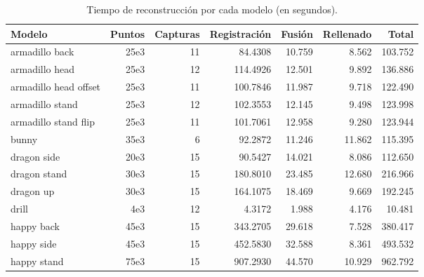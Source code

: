 \begin{table}
	\centering
	\begin{tabular}{l*{6}{r}}
		\toprule
		Modelo                 & Puntos   & Capturas  &  Registración & Fusión   & Rellenado & Total\\
		\midrule
		armadillo back         &  25e3    &   11      &   84.4308        & 10.759  &  8.562  & 103.752\\
		armadillo head         &  25e3    &   12      &   114.4926       & 12.501  &  9.892  & 136.886\\
		armadillo head offset  &  25e3    &   11      &   100.7846       & 11.987  &  9.718  & 122.490\\
		armadillo stand        &  25e3    &   12      &   102.3553       & 12.145  &  9.498  & 123.998\\
		armadillo stand flip   &  25e3    &   11      &   101.7061       & 12.958  &  9.280  & 123.944\\
		\midrule
		bunny                  &  35e3    &   6       &    92.2872       & 11.246  &  11.862 & 115.395\\
		\midrule
		dragon side            &  20e3    &   15      &   90.5427        & 14.021  &  8.086  & 112.650\\
		dragon stand           &  30e3    &   15      &   180.8010       & 23.485  &  12.680 & 216.966\\
		dragon up              &  30e3    &   15      &   164.1075       & 18.469  &  9.669  & 192.245\\
		\midrule
		drill                  &   4e3    &   12      &   4.3172         & 1.988   &  4.176  & 10.481 \\
		\midrule
		happy back             &  45e3    &   15      &   343.2705       & 29.618  &  7.528  & 380.417\\
		happy side             &  45e3    &   15      &   452.5830       & 32.588  &  8.361  & 493.532\\
		happy stand            &  75e3    &   15      &   907.2930       & 44.570  &  10.929 & 962.792\\
		\bottomrule
	\end{tabular}
	\caption[Tiempo de reconstrucción]{\label{tab:reconstr_time}Tiempo de reconstrucción por cada modelo (en segundos).}
\end{table}

